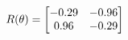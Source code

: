 \documentclass[preview]{standalone}
\begin{document}
\begin{align*}
\special{dvisvgm:raw <g id='unique000'>}R(\theta) = \begin{bmatrix}-0.29 & -0.96\\0.96 & -0.29\end{bmatrix}\special{dvisvgm:raw </g>}
\end{align*}
\end{document}
